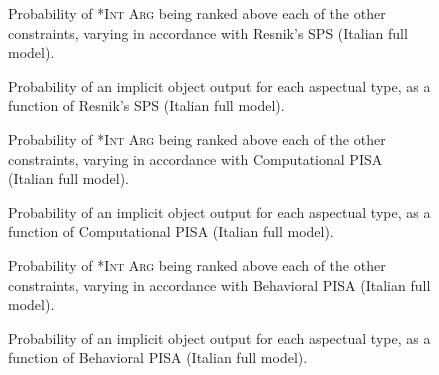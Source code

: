 \begin{figure}[htb]
\caption{Probability of \textsc{*Int Arg} being ranked above each of the other constraints, varying in accordance with Resnik's SPS (Italian full model).}
    
\end{figure}

\begin{figure}[htb]
\caption{Probability of an implicit object output for each aspectual type, as a function of Resnik's SPS (Italian full model).}
    
\end{figure}



\begin{figure}[htb]
\caption{Probability of \textsc{*Int Arg} being ranked above each of the other constraints, varying in accordance with Computational PISA (Italian full model).}
    
\end{figure}

\begin{figure}[htb]
\caption{Probability of an implicit object output for each aspectual type, as a function of Computational PISA (Italian full model).}
    
\end{figure}



\begin{figure}[htb]
\caption{Probability of \textsc{*Int Arg} being ranked above each of the other constraints, varying in accordance with Behavioral PISA (Italian full model).}
    
\end{figure}

\begin{figure}[htb]
\caption{Probability of an implicit object output for each aspectual type, as a function of Behavioral PISA (Italian full model).}
    
\end{figure}